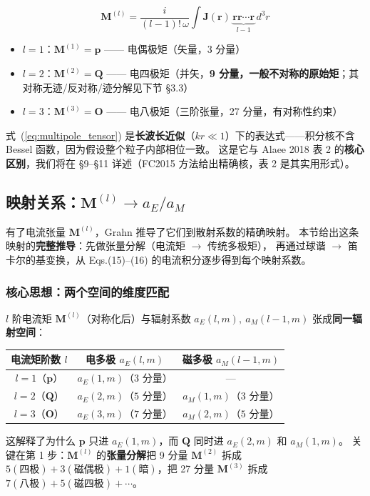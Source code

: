 \begin{equation}
  \boxed{\;
    \mathbf{M}^{(l)} = \frac{i}{(l-1)!\,\omega} \int \mathbf{J}(\mathbf{r})\,
      \underbrace{\mathbf{r}\mathbf{r}\cdots\mathbf{r}}_{l-1}\,d^3r
    \;}
  \label{eq:multipole_tensor}
\end{equation}

\begin{itemize}
  \item $l=1$：$\mathbf{M}^{(1)} = \mathbf{p}$ —— 电偶极矩（矢量，3 分量）
  \item $l=2$：$\mathbf{M}^{(2)} = \mathbf{Q}$ —— 电四极矩（并矢，\textbf{9 分量，一般不对称的原始矩}；其对称无迹/反对称/迹分解见下节 \S3.3）
  \item $l=3$：$\mathbf{M}^{(3)} = \mathbf{O}$ —— 电八极矩（三阶张量，27 分量，有对称性约束）
\end{itemize}

\begin{important}
式~(\ref{eq:multipole_tensor}) 是\textbf{长波长近似}（$kr\ll1$）下的表达式——积分核不含 Bessel 函数，因为假设整个粒子内部相位一致。
这是它与 Alaee 2018 表 2 的\textbf{核心区别}，我们将在 \S9--\S11 详述（FC2015 方法给出精确核，表 2 是其实用形式）。
\end{important}

\subsection{映射关系：$\mathbf{M}^{(l)}\to a_E/a_M$}

有了电流张量 $\mathbf{M}^{(l)}$，Grahn 推导了它们到散射系数的精确映射。
本节给出这条映射的\textbf{完整推导}：先做张量分解（电流矩 $\to$ 传统多极矩），
再通过球谐 $\to$ 笛卡尔的基变换，从 Eqs.(15)--(16) 的电流积分逐步得到每个映射系数。

\subsubsection{核心思想：两个空间的维度匹配}

$l$ 阶电流矩 $\mathbf{M}^{(l)}$（对称化后）与辐射系数 $a_E(l,m),\ a_M(l-1,m)$ 张成\textbf{同一辐射空间}：
\begin{center}
\begin{tabular}{ccc}
\toprule
电流矩阶数 $l$ & 电多极 $a_E(l,m)$ & 磁多极 $a_M(l-1,m)$ \\
\midrule
$l=1$（$\mathbf{p}$） & $a_E(1,m)$（$3$ 分量） & --- \\
$l=2$（$\mathbf{Q}$） & $a_E(2,m)$（$5$ 分量） & $a_M(1,m)$（$3$ 分量） \\
$l=3$（$\mathbf{O}$） & $a_E(3,m)$（$7$ 分量） & $a_M(2,m)$（$5$ 分量） \\
\bottomrule
\end{tabular}
\end{center}
这解释了为什么 $\mathbf{p}$ 只进 $a_E(1,m)$，而 $\mathbf{Q}$ 同时进 $a_E(2,m)$ 和 $a_M(1,m)$。
关键在第 1 步：$\mathbf{M}^{(l)}$ 的\textbf{张量分解}把 9 分量 $\mathbf{M}^{(2)}$ 拆成
$5(\text{四极})+3(\text{磁偶极})+1(\text{暗})$，把 27 分量 $\mathbf{M}^{(3)}$ 拆成
$7(\text{八极})+5(\text{磁四极})+\cdots$。

